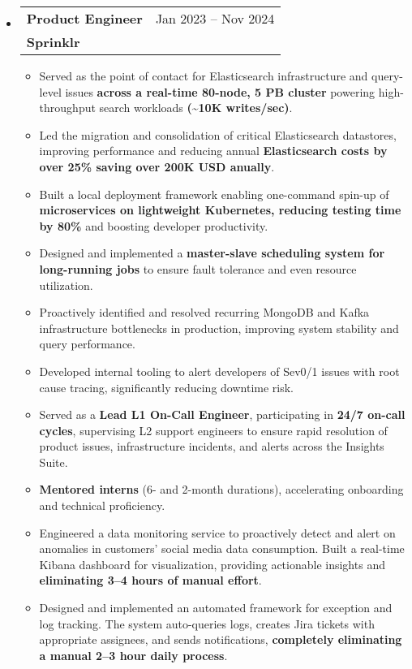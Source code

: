 \documentclass[letterpaper,10.8pt]{article}
\makeatletter
\newcommand{\resumeSubheading}[4]{
  \vspace{-1pt}\item
    \begin{tabular*}{0.97\textwidth}{l@{\extracolsep{\fill}}r}
      \textbf{#1} & #2 \\
      \textbf{#3} & \textit{\small #4} \\
    \end{tabular*}\vspace{-5pt}
}
\newcommand{\resumeSubHeadingListStart}{\begin{itemize}[leftmargin=*]}
\newcommand{\resumeSubHeadingListEnd}{\end{itemize}}
\makeatother
\begin{document}
\resumeSubHeadingListStart
  \resumeSubheading
    {Product Engineer}{Jan 2023 – Nov 2024}
    {Sprinklr}{}
    \begin{itemize}[itemsep=0pt]
        \item Served as the point of contact for Elasticsearch infrastructure and query-level issues \textbf{across a real-time 80-node, 5 PB cluster} powering high-throughput search workloads \textbf{(\textasciitilde10K writes/sec)}.
        \item Led the migration and consolidation of critical Elasticsearch datastores, improving performance and reducing annual \textbf{Elasticsearch costs by over 25\% saving over 200K USD anually}.
        \item Built a local deployment framework enabling one-command spin-up of \textbf{microservices on lightweight Kubernetes, reducing testing time by 80\%} and boosting developer productivity.
        \item Designed and implemented a \textbf{master-slave scheduling system for long-running jobs} to ensure fault tolerance and even resource utilization.
        \item Proactively identified and resolved recurring MongoDB and Kafka infrastructure bottlenecks in production, improving system stability and query performance.
        \item Developed internal tooling to alert developers of Sev0/1 issues with root cause tracing, significantly reducing downtime risk.
        \item Served as a \textbf{Lead L1 On-Call Engineer}, participating in \textbf{24/7 on-call cycles}, supervising L2 support engineers to ensure rapid resolution of product issues, infrastructure incidents, and alerts across the Insights Suite.
        \item \textbf{Mentored interns} (6- and 2-month durations), accelerating onboarding and technical proficiency.
        \item Engineered a data monitoring service to proactively detect and alert on anomalies in customers' social media data consumption. Built a real-time Kibana dashboard for visualization, providing actionable insights and \textbf{eliminating 3–4 hours of manual effort}.
        \item Designed and implemented an automated framework for exception and log tracking. The system auto-queries logs, creates Jira tickets with appropriate assignees, and sends notifications, \textbf{completely eliminating a manual 2–3 hour daily process}.
    \end{itemize}
\resumeSubHeadingListEnd
\end{document}
